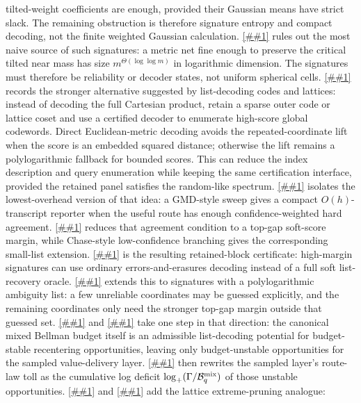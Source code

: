 \documentclass[10pt]{article}
\newcommand{\cref}[1]{\ref{##1}}
\newcommand{\Cref}[1]{\ref{##1}}
\theoremstyle{definition}
\begin{document}
tilted-weight coefficients are enough, provided their Gaussian means have
strict slack.  The
remaining obstruction is therefore signature entropy and compact decoding, not
the finite weighted Gaussian calculation.
\Cref{rem:metric-net-signature-barrier} rules out the most naive source of
such signatures: a metric net fine enough to preserve the critical tilted near
mass has size \(m^{\Theta(\log\log m)}\) in logarithmic dimension.  The
signatures must therefore be reliability or decoder states, not uniform
spherical cells.
\Cref{rem:outer-list-recovery-codebook} records the stronger alternative
suggested by list-decoding codes and lattices: instead of decoding the full
Cartesian product, retain a sparse outer code or lattice coset and use a
certified decoder to enumerate high-score global codewords.  Direct
Euclidean-metric decoding avoids the repeated-coordinate lift when the score is
an embedded squared distance; otherwise the lift remains a polylogarithmic
fallback for bounded scores.  This can reduce the index description and query
enumeration while keeping the same certification interface, provided the
retained panel satisfies the random-like spectrum.
\Cref{lem:reliability-erasure-sweep} isolates the lowest-overhead version of
that idea: a GMD-style sweep gives a compact \(O(h)\)-transcript reporter when
the useful route has enough confidence-weighted hard agreement.
\Cref{lem:soft-score-gmd-margin} reduces that agreement condition to a
top-gap soft-score margin, while Chase-style low-confidence branching gives
the corresponding small-list extension.
\Cref{cor:gmd-block-certificate} is the resulting retained-block certificate:
high-margin signatures can use ordinary errors-and-erasures decoding instead
of a full soft list-recovery oracle.
\Cref{cor:chase-gmd-block-certificate} extends this to signatures with a
polylogarithmic ambiguity list: a few unreliable coordinates may be guessed
explicitly, and the remaining coordinates only need the stronger top-gap
margin outside that guessed set.
\Cref{lem:budget-stable-prefix-list} and
\cref{cor:canonical-budget-stable-decoder} take one step in that direction:
the canonical mixed Bellman budget itself is an admissible list-decoding
potential for budget-stable recentering opportunities, leaving only
budget-unstable opportunities for the sampled value-delivery layer.
\Cref{cor:canonical-budget-defect-toll} then rewrites the sampled layer's
route-law toll as the cumulative log deficit
\(\log_+(\Gamma/\mathcal B_q^{\rm mix})\) of those unstable opportunities.
\Cref{lem:pruned-budget-thinning} and
\cref{cor:pruned-budget-defect-toll} add the lattice extreme-pruning analogue:
\end{document}
